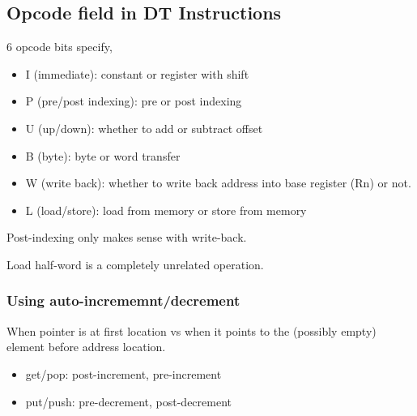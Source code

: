 \documentclass{scrartcl}
\begin{document}
\subsection{Opcode field in DT Instructions}
6 opcode bits specify,
\begin{itemize}
	\item I (immediate): constant or register with shift
	\item P (pre/post indexing): pre or post indexing
	\item U (up/down): whether to add or subtract offset
	\item B (byte): byte or word transfer
	\item W (write back): whether to write back address into base register (Rn) or not.
	\item L (load/store): load from memory or store from memory
\end{itemize}
Post-indexing only makes sense with write-back.

Load half-word is a completely unrelated operation.


\subsubsection{Using auto-incrememnt/decrement}
When pointer is at first location vs when it points to the (possibly empty) element before address location.
\begin{itemize}
	\item get/pop: post-increment, pre-increment
	\item put/push: pre-decrement, post-decrement
\end{itemize}
\end{document}
